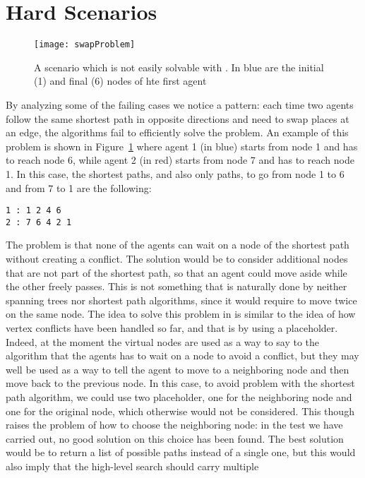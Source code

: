 \section{Hard Scenarios}
\begin{figure}[tb]
  \centering
  \texttt{[image: swapProblem]}
  \caption{A scenario which is not easily solvable with . In blue are
  the initial (1) and final (6) nodes of hte first agent}
  \label{fig:swapProblem}
\end{figure}
By analyzing some of the failing cases we notice a pattern: each time two
agents follow the same shortest path in opposite directions and need to swap
places at an edge, the algorithms fail to efficiently solve the problem. An
example of this problem is shown in Figure~\ref{fig:swapProblem} where agent 1
(in blue) starts from node 1 and has to reach node 6, while agent 2 (in red)
starts from node 7 and has to reach node 1. In this case, the shortest paths,
and also only paths, to go from node 1 to 6 and from 7 to 1 are the following: 
\begin{verbatim}
1 : 1 2 4 6
2 : 7 6 4 2 1
\end{verbatim}
The problem is that none of the agents can wait on a node of the shortest path
without creating a conflict. The solution would be to consider additional nodes
that are not part of the shortest path, so that an agent could move aside
while the other freely passes. This is not something that is naturally done
by neither spanning trees nor shortest path algorithms, since it would require
to move twice on the same node. \newline
The idea to solve this problem in  is similar to the idea of how
vertex conflicts have been handled so far, and that is by using a placeholder.
Indeed, at the moment the virtual nodes are used as a way to say to the
algorithm that the agents has to wait on a node to avoid a conflict, but they
may well be used as a way to tell the agent to move to a neighboring node and
then move back to the previous node. In this case, to avoid problem with the
shortest path algorithm, we could use two placeholder, one for the neighboring
node and one for the original node, which otherwise would not be considered.
This though raises the problem of how to choose the neighboring node: in the
test we have carried out, no good solution on this choice has been found. The
best solution would be to return a list of possible paths instead of a single
one, but this would also imply that the high-level search should carry multiple
